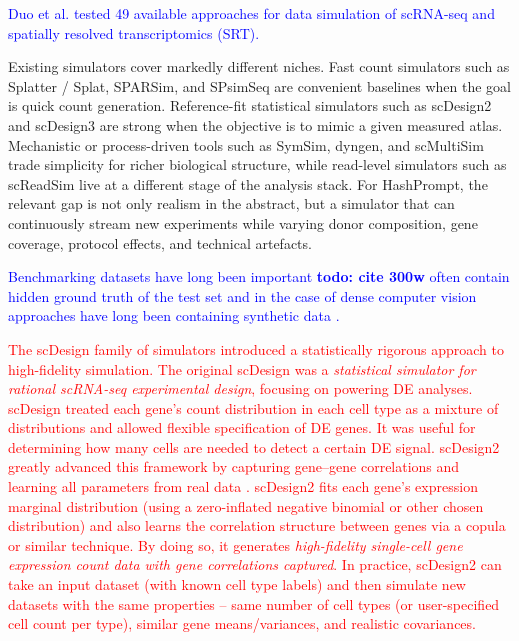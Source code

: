 \documentclass{article}
\newcommand{\phflo}[1]{\textcolor{blue}{#1}}
\newcommand{\gpt}[1]{\textcolor{red}{#1}}
\begin{document}
\phflo{Duo et al. tested 49 available approaches for data simulation of scRNA-seq and spatially resolved transcriptomics (SRT). }

Existing simulators cover markedly different niches. Fast count simulators such as Splatter / Splat, SPARSim, and SPsimSeq are convenient baselines when the goal is quick count generation. Reference-fit statistical simulators such as scDesign2 and scDesign3 are strong when the objective is to mimic a given measured atlas. Mechanistic or process-driven tools such as SymSim, dyngen, and scMultiSim trade simplicity for richer biological structure, while read-level simulators such as scReadSim live at a different stage of the analysis stack. For HashPrompt, the relevant gap is not only realism in the abstract, but a simulator that can continuously stream new experiments while varying donor composition, gene coverage, protocol effects, and technical artefacts.

\phflo{
Benchmarking datasets have long been important \textbf{todo: cite 300w} often contain hidden ground truth of the test set \cite{baker2011database, butler2012naturalistic} and in the case of dense computer vision approaches have long been containing synthetic data \cite{baker2011database, butler2012naturalistic}. }

\gpt{The scDesign family of simulators introduced a statistically rigorous approach to high-fidelity simulation. The original scDesign \cite{scdesign} was a \textit{statistical simulator for rational scRNA-seq experimental design}, focusing on powering DE analyses. scDesign treated each gene's count distribution in each cell type as a mixture of distributions and allowed flexible specification of DE genes. It was useful for determining how many cells are needed to detect a certain DE signal. scDesign2 greatly advanced this framework by capturing gene--gene correlations and learning all parameters from real data \cite{scdesign2}. scDesign2 fits each gene's expression marginal distribution (using a zero-inflated negative binomial or other chosen distribution) and also learns the correlation structure between genes via a copula or similar technique. By doing so, it generates \textit{high-fidelity single-cell gene expression count data with gene correlations captured}. In practice, scDesign2 can take an input dataset (with known cell type labels) and then simulate new datasets with the same properties -- same number of cell types (or user-specified cell count per type), similar gene means/variances, and realistic covariances. }
\end{document}
